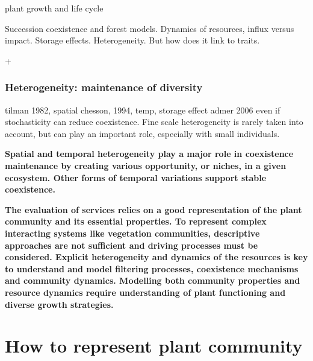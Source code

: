 plant growth and life cycle



 Succession coexistence and forest models. Dynamics of resources, influx versus impact. Storage effects. Heterogeneity. But how does it link to traits.

+ %
 
 
\subsection{Heterogeneity: maintenance of diversity}


tilman 1982, spatial
chesson, 1994, temp, 
storage effect admer 2006
even if stochasticity can reduce coexistence. Fine scale heterogeneity is rarely taken into account, but can play an important role, especially with small individuals.

\textbf{Spatial and temporal heterogeneity play a major role in coexistence maintenance by creating various opportunity, or niches, in a given ecosystem. Other forms of temporal variations support stable coexistence.}
 
 \textbf{The evaluation of services relies on a good representation of the plant community and its essential properties. To represent complex interacting systems like vegetation communities, descriptive approaches are not sufficient and driving processes must be considered. Explicit heterogeneity and dynamics of the resources is key to understand and model filtering processes, coexistence mechanisms and community dynamics. Modelling both community properties and resource dynamics require understanding of plant functioning and diverse growth strategies.}
 

\chapter{How to represent plant community}

